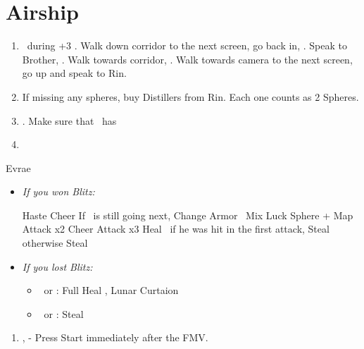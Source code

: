 \chapter{Airship}

\begin{enumerate}
	\item \sd\ during \cs+3 \skippablefmv. Walk down corridor to the next screen, go back in, \sd. Speak to Brother, \sd. Walk towards corridor, \sd. Walk towards camera to the next screen, go up and speak to Rin.
	\item If missing any spheres, buy Distillers from Rin. Each one counts as 2 Spheres.
	\item \save. Make sure that \rikku\ has \od
	\item \formation{\tidus}{\rikku}{\kimahri}
\end{enumerate}
\begin{battle}[32000]{Evrae}
	\begin{itemize}
	\item \textit{If you won Blitz:}
	\begin{itemize}
		\tidusf Haste \tidus
		\tidusf Cheer
		\tidusf If \tidus\ is still going next, Change Armor
		\rikkuf \od\ Mix Luck Sphere + Map
		\tidusf Attack x2
		\tidusf Cheer
		\tidusf Attack x3
		\kimahrif Heal \tidus\ if he was hit in the first attack, Steal otherwise
		\rikkuf Steal
	\end{itemize}
	\item \textit{If you lost Blitz:}
	\begin{itemize}
		\tidusf Haste \tidus
		\tidusf Cheer x2
		\tidusf Equip Baroque Sword
		\tidusf Attack x6
		\rikkuf \od\ Mix Luck Sphere + Map
		\item \kimahri\ or \rikku: Full Heal \tidus, Lunar Curtaion \tidus
		\item \kimahri\ or \rikku: Steal
	\end{itemize}
\end{itemize}
\end{battle}
\begin{enumerate}[resume]
	\item \sd, \skippablefmv[3:00] - Press Start immediately after the FMV.
\end{enumerate}
\vfill \ 

\columnbreak